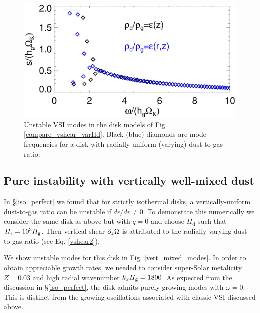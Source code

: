 \begin{figure}
  \includegraphics[width=\linewidth]{figures/compare_eigenvals_varHd} 
  \caption{Unstable VSI modes in the disk models of
    Fig. \protect\ref{compare_vshear_varHd}.  Black (blue) diamonds
    are mode frequencies for a disk with radially uniform (varying)
    dust-to-gas ratio. 
    \label{vsi_dust_varHd}
    }
\end{figure}

\subsection{Pure instability with vertically well-mixed
  dust}\label{vert_mixed} 

In \S\ref{iso_perfect} we found that for strictly isothermal
disks, a vertically-uniform dust-to-gas ratio can be unstable
if $d\epsilon/dr\neq0$.  
To demonstate this numerically we consider the
same disk as above but with $q=0$ and choose $H_\mathrm{d}$ such
that $H_\epsilon=10^3H_\mathrm{g}$. Then vertical shear $\partial_z\Omega$ is 
attributed to the radially-varying dust-to-gas ratio (see
Eq. \ref{vshear2}).    

We show unstable modes for this disk in
Fig. \ref{vert_mixed_modes}. In order to obtain appreciable growth   
rates, we needed to consider super-Solar metalicity $Z=0.03$ and high
radial wavenumber $k_xH_\mathrm{g}=1800$. As expected from the discussion in
\S\ref{iso_perfect}, the disk admits purely growing modes with
$\omega=0$. This is distinct from the growing oscillations associated
with classic VSI discussed above. 

